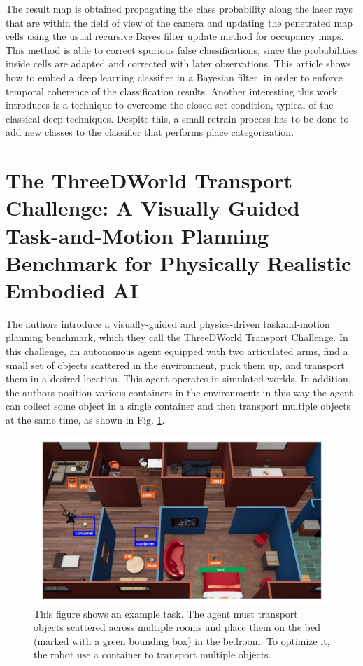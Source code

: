 \newpage

The result map is obtained propagating the class probability along the laser rays that are within the field of view of the
camera and updating the penetrated map cells using the usual
recursive Bayes filter update method \cite{246776423} for occupancy
maps. This method is able to correct spurious false classifications, since the probabilities inside cells are adapted and corrected with later observations. This article shows how to embed a deep learning classifier in a Bayesian filter, in order to enforce temporal coherence of the classification results. Another interesting this work introduces is a technique to overcome the closed-set condition, typical of the classical deep techniques. Despite this, a small retrain process has to be done to add new classes to the classifier that performs place categorization.

\section{The ThreeDWorld Transport Challenge: A Visually Guided
	Task-and-Motion Planning Benchmark for Physically Realistic Embodied AI \cite{gan2021threedworld}}

The authors introduce a visually-guided and physics-driven taskand-motion planning benchmark, which they call the ThreeDWorld Transport Challenge. In this challenge, an autonomous agent equipped with two articulated arms, find a small set of objects scattered in the environment, puck them up, and transport them in a desired location. This agent operates in simulated worlds. In addition, the authors position various containers in the environment: in this way the agent can collect some object in a single container and then transport multiple objects at the same time, as shown in Fig. \ref{fig:method}.

\begin{figure}[h!]
	\centering
	\includegraphics[width=0.7\linewidth]{images/challenge_move_object.png}
	\caption{This figure shows an example task. The agent must transport objects
		scattered across multiple rooms and place them on the bed (marked with a green bounding box) in the bedroom. To optimize it, the robot use a container to transport multiple objects.}
	\label{fig:method}
\end{figure} 

